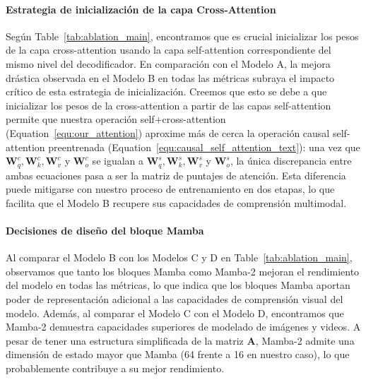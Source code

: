 \vspace{-1em}
\paragraph{Estrategia de inicialización de la capa Cross-Attention} Según Table~\ref{tab:ablation_main}, encontramos que es crucial inicializar los pesos de la capa cross-attention usando la capa self-attention correspondiente del mismo nivel del decodificador. En comparación con el Modelo A, la mejora drástica observada en el Modelo B en todas las métricas subraya el impacto crítico de esta estrategia de inicialización. Creemos que esto se debe a que inicializar los pesos de la cross-attention a partir de las capas self-attention permite que nuestra operación self$+$cross-attention (Equation~\ref{equ:our_attention}) aproxime más de cerca la operación causal self-attention preentrenada (Equation~\ref{equ:causal_self_attention_text}): una vez que $\mathbf{W}_q^c,\mathbf{W}_k^c,\mathbf{W}_v^c$ y $\mathbf{W}_o^c$ se igualan a $\mathbf{W}_q^s,\mathbf{W}_k^s,\mathbf{W}_v^s$ y $\mathbf{W}_o^s$, la única discrepancia entre ambas ecuaciones pasa a ser la matriz de puntajes de atención. Esta diferencia puede mitigarse con nuestro proceso de entrenamiento en dos etapas, lo que facilita que el Modelo B recupere sus capacidades de comprensión multimodal.


\vspace{-1em}
\paragraph{Decisiones de diseño del bloque Mamba} Al comparar el Modelo B con los Modelos C y D en Table~\ref{tab:ablation_main}, observamos que tanto los bloques Mamba como Mamba-2 mejoran el rendimiento del modelo en todas las métricas, lo que indica que los bloques Mamba aportan poder de representación adicional a las capacidades de comprensión visual del modelo. Además, al comparar el Modelo C con el Modelo D, encontramos que Mamba-2 demuestra capacidades superiores de modelado de imágenes y videos. A pesar de tener una estructura simplificada de la matriz $\mathbf{A}$, Mamba-2 admite una dimensión de estado mayor que Mamba (64 frente a 16 en nuestro caso), lo que probablemente contribuye a su mejor rendimiento.

\vspace{-1em}
